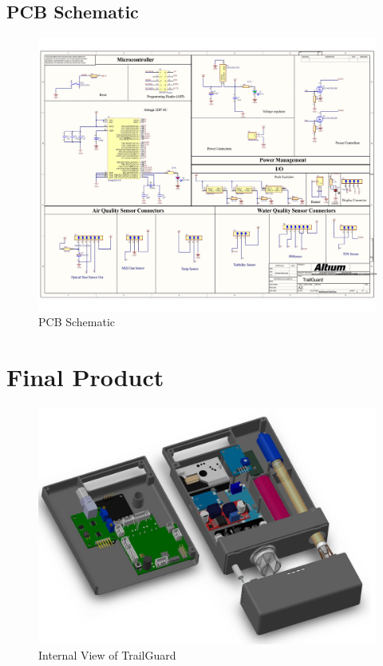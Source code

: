 \documentclass[a4paper,11pt]{article}%
\begin{document}
\subsection{PCB Schematic}
\begin{figure}[!h]
    \centering
    \includegraphics[scale=0.6]{./figures/PCB_schematic.jpg}
    \caption{PCB Schematic}
\end{figure}

\newpage
\section{Final Product}
\begin{figure}[!h]
    \centering
    \includegraphics[scale=0.55]{./figures/finalinternal.jpg}
    \caption{Internal View of TrailGuard}
\end{figure}
\end{document}
